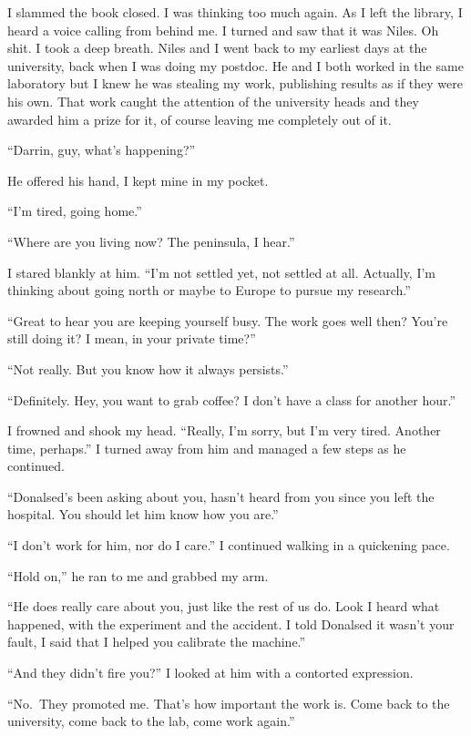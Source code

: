 I slammed the book closed. I was thinking too much again. As I left the
library, I heard a voice calling from behind me. I turned and saw that
it was Niles. Oh shit. I took a deep breath. Niles and I went back to my
earliest days at the university, back when I was doing my postdoc. He
and I both worked in the same laboratory but I knew he was stealing my
work, publishing results as if they were his own. That work caught the
attention of the university heads and they awarded him a prize for it,
of course leaving me completely out of it.

``Darrin, guy, what's happening?''

He offered his hand, I kept mine in my pocket.

``I'm tired, going home.''

``Where are you living now? The peninsula, I hear.''

I stared blankly at him. ``I'm not settled yet, not settled at all.
Actually, I'm thinking about going north or maybe to Europe to pursue my
research.''

``Great to hear you are keeping yourself busy. The work goes well then?
You're still doing it? I mean, in your private time?''

``Not really. But you know how it always persists.''

``Definitely. Hey, you want to grab coffee? I don't have a class for
another hour.''

I frowned and shook my head. ``Really, I'm sorry, but I'm very tired.
Another time, perhaps.'' I turned away from him and managed a few steps
as he continued.

``Donalsed's been asking about you, hasn't heard from you since you left
the hospital. You should let him know how you are.''

``I don't work for him, nor do I care.'' I continued walking in a
quickening pace.

``Hold on,'' he ran to me and grabbed my arm.

``He does really care about you, just like the rest of us do. Look I
heard what happened, with the experiment and the accident. I told
Donalsed it wasn't your fault, I said that I helped you calibrate the
machine.''

``And they didn't fire you?'' I looked at him with a contorted
expression.

``No.~They promoted me. That's how important the work is. Come back to
the university, come back to the lab, come work again.''

